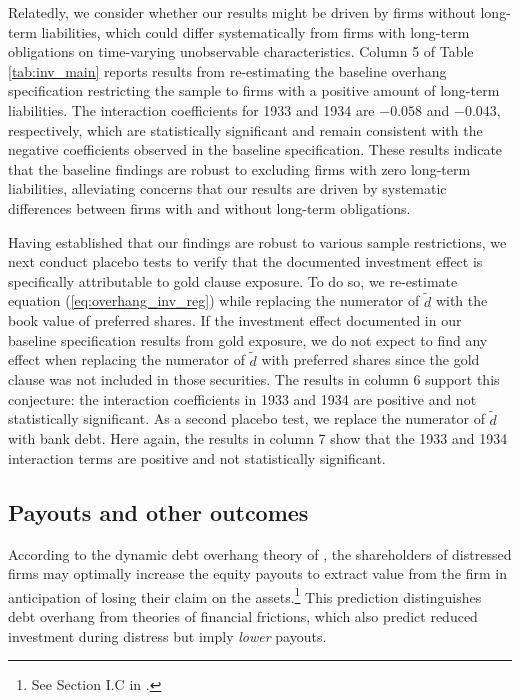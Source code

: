 Relatedly, we consider whether our results might be driven by firms without long-term liabilities, which could differ systematically from firms with long-term obligations on time-varying unobservable characteristics. Column 5 of Table \ref{tab:inv_main} reports results from re-estimating the baseline overhang specification restricting the sample to firms with a positive amount of long-term liabilities. The interaction coefficients for 1933 and 1934 are $-0.058$ and $-0.043$, respectively, which are statistically significant and remain consistent with the negative coefficients observed in the baseline specification. These results indicate that the baseline findings are robust to excluding firms with zero long-term liabilities, alleviating concerns that our results are driven by systematic differences between firms with and without long-term obligations.

Having established that our findings are robust to various sample restrictions, we next conduct placebo tests to verify that the documented investment effect is specifically attributable to gold clause exposure. To do so, we re-estimate equation (\ref{eq:overhang_inv_reg}) while replacing the numerator of $\tilde{d}$ with the book value of preferred shares. If the investment effect documented in our baseline specification results from gold exposure, we do not expect to find any effect when replacing the numerator of $\tilde{d}$ with preferred shares since the gold clause was not included in those securities. The results in column 6 support this conjecture: the interaction coefficients in 1933 and 1934 are positive and not statistically significant. As a second placebo test, we replace the numerator of $\tilde{d}$ with bank debt. Here again, the results in column 7 show that the 1933 and 1934 interaction terms are positive and not statistically significant.

\subsection{Payouts and other outcomes}
\label{sec:payouts}
\noindent
According to the dynamic debt overhang theory of \cite{Hennessy2004}, the shareholders of distressed firms may optimally increase the equity payouts to extract value from the firm in anticipation of losing their claim on the assets.\footnote{See Section I.C in \cite{Hennessy2004}.} This prediction distinguishes debt overhang from theories of financial frictions, which also predict reduced investment during distress but imply \textit{lower} payouts.

